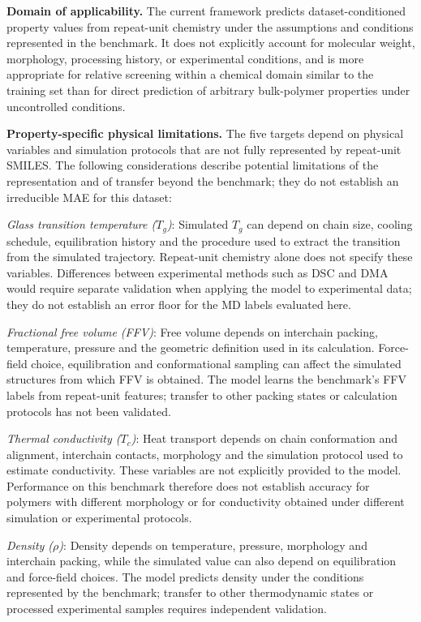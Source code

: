 \documentclass{article}
\begin{document}
\textbf{Domain of applicability.} The current framework predicts dataset-conditioned property values from repeat-unit chemistry under the assumptions and conditions represented in the benchmark. It does not explicitly account for molecular weight, morphology, processing history, or experimental conditions, and is more appropriate for relative screening within a chemical domain similar to the training set than for direct prediction of arbitrary bulk-polymer properties under uncontrolled conditions.

\textbf{Property-specific physical limitations.} The five targets depend on physical variables and simulation protocols that are not fully represented by repeat-unit SMILES. The following considerations describe potential limitations of the representation and of transfer beyond the benchmark; they do not establish an irreducible MAE for this dataset:

\emph{Glass transition temperature ($T_g$)}: Simulated $T_g$ can depend on chain size, cooling schedule, equilibration history and the procedure used to extract the transition from the simulated trajectory. Repeat-unit chemistry alone does not specify these variables. Differences between experimental methods such as DSC and DMA would require separate validation when applying the model to experimental data; they do not establish an error floor for the MD labels evaluated here.

\emph{Fractional free volume (FFV)}: Free volume depends on interchain packing, temperature, pressure and the geometric definition used in its calculation. Force-field choice, equilibration and conformational sampling can affect the simulated structures from which FFV is obtained. The model learns the benchmark's FFV labels from repeat-unit features; transfer to other packing states or calculation protocols has not been validated.

\emph{Thermal conductivity ($T_c$)}: Heat transport depends on chain conformation and alignment, interchain contacts, morphology and the simulation protocol used to estimate conductivity. These variables are not explicitly provided to the model. Performance on this benchmark therefore does not establish accuracy for polymers with different morphology or for conductivity obtained under different simulation or experimental protocols.

\emph{Density ($\rho$)}: Density depends on temperature, pressure, morphology and interchain packing, while the simulated value can also depend on equilibration and force-field choices. The model predicts density under the conditions represented by the benchmark; transfer to other thermodynamic states or processed experimental samples requires independent validation.
\end{document}
